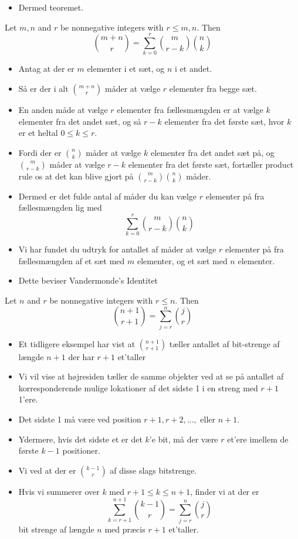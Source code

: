 \documentclass{beamer}
\begin{document}
\begin{frame}[allowframebreaks]
\begin{itemize}
  \item Dermed teoremet.
  \end{itemize}
  \begin{theorem}
    Let $m, n$ and $r$ be nonnegative integers with $r \leq m, n$. Then
    \[ \binom{m+n }{r} = \sum_{k=0}^{r} \binom{m}{r-k} \binom{n}{k}  \]
  \end{theorem}
  \begin{itemize}
  \item Antag at der er $m$ elementer i et sæt, og $n$ i et andet. 
  \item Så er der i alt $\binom{m+n }{r}$ måder at vælge $r$ elementer fra begge sæt.
  \item En anden måde at vælge $r$ elementer fra fællesmængden er at vælge $k$ elementer fra det andet sæt, og så $r-k$ elementer fra det første sæt, hvor $k$ er et heltal $0 \leq k \leq r$. 
  \item Fordi der er $\binom{n}{k}$ måder at vælge $k$ elementer fra det andet sæt på, og $\binom{m}{r-k}$ måder at vælge $r-k$ elementer fra det første sæt, fortæller product rule os at det kan blive gjort på $\binom{m}{r-k} \binom{n}{k}$ måder. 
  \item Dermed er det fulde antal af måder du kan vælge $r$ elementer på fra fællesmængden lig med \[ \sum_{k=0}^{r} \binom{m}{r-k} \binom{n}{k} \]
  \item Vi har fundet du udtryk for antallet af måder at vælge $r$ elementer på fra fællesmængden af et sæt med $m$ elementer, og et sæt med $n$ elementer. 
  \item Dette beviser Vandermonde's Identitet
    \end{itemize}
    \begin{theorem}[4]
      Let $n$ and $r$ be nonnegative integers with $r \leq n$. Then
      \[ \binom{n+1}{r+1} = \sum_{j=r}^{n}\binom{j}{r} \]
    \end{theorem}
    \begin{itemize}
    \item Et tidligere eksempel har vist at $\binom{n+1}{r+1}$ tæller antallet af bit-strenge af længde $n+1$ der har $r+1$ et'taller
    \item Vi vil vise at højresiden tæller de samme objekter ved at se på antallet af korresponderende mulige lokationer af det sidste 1 i en streng med $r+1$ 1'ere. 
    \item Det sidste 1 må være ved position $r+1, r+2, \ldots, \text{ eller } n+1$. 
    \item Ydermere, hvis det sidste et er det $k$'e bit, må der være $r$ et'ere imellem de første $k-1$ positioner. 
    \item Vi ved at der er $\binom{k-1}{r}$ af disse slags bitstrenge. 
    \item Hvis vi summerer over $k$ med $r + 1 \leq k \leq n + 1$, finder vi at der er
      \[ \sum_{k=r+1}^{n+1} \binom{k-1}{r} = \sum_{j=r}^{n} \binom{j}{r} \]
      bit strenge af længde $n$ med præcis $r+1$ et'taller.
    \end{itemize}
\end{frame}
\end{document}
